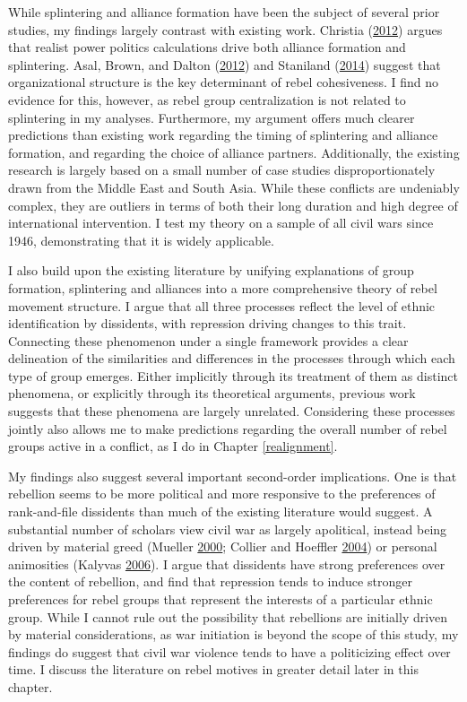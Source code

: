 \documentclass[12pt,]{book}
\theoremstyle{definition}
\theoremstyle{definition}
\theoremstyle{definition}
\theoremstyle{remark}
\begin{document}
While splintering and alliance formation have been the subject of
several prior studies, my findings largely contrast with existing work.
Christia (\protect\hyperlink{ref-Christia2012}{2012}) argues that
realist power politics calculations drive both alliance formation and
splintering. Asal, Brown, and Dalton
(\protect\hyperlink{ref-Asal2012}{2012}) and Staniland
(\protect\hyperlink{ref-Staniland2014}{2014}) suggest that
organizational structure is the key determinant of rebel cohesiveness. I
find no evidence for this, however, as rebel group centralization is not
related to splintering in my analyses. Furthermore, my argument offers
much clearer predictions than existing work regarding the timing of
splintering and alliance formation, and regarding the choice of alliance
partners. Additionally, the existing research is largely based on a
small number of case studies disproportionately drawn from the Middle
East and South Asia. While these conflicts are undeniably complex, they
are outliers in terms of both their long duration and high degree of
international intervention. I test my theory on a sample of all civil
wars since 1946, demonstrating that it is widely applicable.

I also build upon the existing literature by unifying explanations of
group formation, splintering and alliances into a more comprehensive
theory of rebel movement structure. I argue that all three processes
reflect the level of ethnic identification by dissidents, with
repression driving changes to this trait. Connecting these phenomenon
under a single framework provides a clear delineation of the
similarities and differences in the processes through which each type of
group emerges. Either implicitly through its treatment of them as
distinct phenomena, or explicitly through its theoretical arguments,
previous work suggests that these phenomena are largely unrelated.
Considering these processes jointly also allows me to make predictions
regarding the overall number of rebel groups active in a conflict, as I
do in Chapter \ref{realignment}.

My findings also suggest several important second-order implications.
One is that rebellion seems to be more political and more responsive to
the preferences of rank-and-file dissidents than much of the existing
literature would suggest. A substantial number of scholars view civil
war as largely apolitical, instead being driven by material greed
(Mueller \protect\hyperlink{ref-mueller00}{2000}; Collier and Hoeffler
\protect\hyperlink{ref-Collier2004}{2004}) or personal animosities
(Kalyvas \protect\hyperlink{ref-Kalyvas2006}{2006}). I argue that
dissidents have strong preferences over the content of rebellion, and
find that repression tends to induce stronger preferences for rebel
groups that represent the interests of a particular ethnic group. While
I cannot rule out the possibility that rebellions are initially driven
by material considerations, as war initiation is beyond the scope of
this study, my findings do suggest that civil war violence tends to have
a politicizing effect over time. I discuss the literature on rebel
motives in greater detail later in this chapter.
\end{document}
